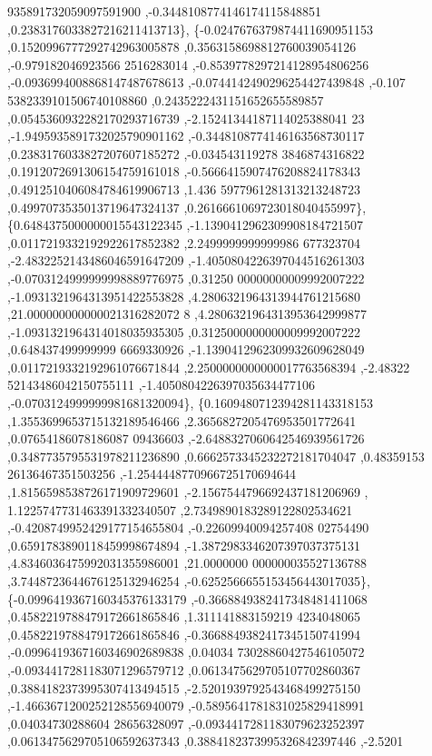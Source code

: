 \begin{DoxyCode}
      935891732059097591900 ,-0.3448108774146174115848851 ,0.2383176033827216211413713\},
\{-0.0247676379874411690951153 ,0.1520996777292742963005878 ,0.3563158698812760039054126 ,-0.979182046923566
      2516283014 ,-0.8539778297214128954806256 ,-0.0936994008868147487678613 ,-0.0744142490296254427439848 ,-0.107
      5382339101506740108860 ,0.2435222431151652655589857 ,0.0545360932282170293716739 ,-2.15241344187114025388041
      23 ,-1.9495935891732025790901162 ,-0.3448108774146163568730117 ,0.2383176033827207607185272 ,-0.034543119278
      3846874316822 ,0.1912072691306154759161018 ,-0.5666415907476208824178343 ,0.4912510406084784619906713 ,1.436
      5977961281313213248723 ,0.4997073535013719647324137 ,0.2616661069723018040455997\},
\{0.6484375000000015543122345 ,-1.1390412962309908184721507 ,0.0117219332192922617852382 ,2.2499999999999986
      677323704 ,-2.4832252143486046591647209 ,-1.4050804226397044516261303 ,-0.0703124999999998889776975 ,0.31250
      00000000009992007222 ,-1.0931321964313951422553828 ,4.2806321964313944761215680 ,21.000000000000021316282072
      8 ,4.2806321964313953642999877 ,-1.0931321964314018035935305 ,0.3125000000000009992007222 ,0.648437499999999
      6669330926 ,-1.1390412962309932609628049 ,0.0117219332192961076671844 ,2.2500000000000017763568394 ,-2.48322
      52143486042150755111 ,-1.4050804226397035634477106 ,-0.0703124999999981681320094\},
\{0.1609480712394281143318153 ,1.3553699653715132189546466 ,2.3656827205476953501772641 ,0.07654186078186087
      09436603 ,-2.6488327060642546939561726 ,0.3487735795531978211236890 ,0.6662573345232272181704047 ,0.48359153
      26136467351503256 ,-1.2544448770966725170694644 ,1.8156598538726171909729601 ,-2.1567544796692437181206969 ,
      1.1225747731463391332340507 ,2.7349890183289122802534621 ,-0.4208749952429177154655804 ,-0.22609940094257408
      02754490 ,0.6591783890118459998674894 ,-1.3872983346207397037375131 ,4.8346036475992031355986001 ,21.0000000
      000000035527136788 ,3.7448723644676125132946254 ,-0.6252566655153456443017035\},
\{-0.0996419367160345376133179 ,-0.3668849382417348481411068 ,0.4582219788479172661865846 ,1.311141883159219
      4234048065 ,0.4582219788479172661865846 ,-0.3668849382417345150741994 ,-0.0996419367160346902689838 ,0.04034
      73028860427546105072 ,-0.0934417281183071296579712 ,0.0613475629705107702860367 ,0.3884182373995307413494515
       ,-2.5201939792543468499275150 ,-1.4663671200252128556940079 ,-0.5895641781831025829418991 ,0.04034730288604
      28656328097 ,-0.0934417281183079623252397 ,0.0613475629705106592637343 ,0.3884182373995326842397446 ,-2.5201

\end{DoxyCode}
